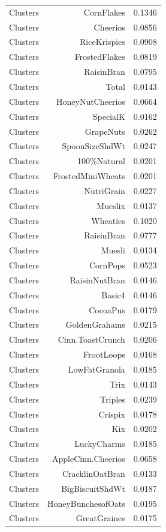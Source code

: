 \begin{longtable}{@{}lrr@{}}
Clusters & CornFlakes & 0.1346 \\
Clusters & Cheerios & 0.0856 \\
Clusters & RiceKrispies & 0.0908 \\
Clusters & FrostedFlakes & 0.0819 \\
Clusters & RaisinBran & 0.0795 \\
Clusters & Total & 0.0143 \\
Clusters & HoneyNutCheerios & 0.0664 \\
Clusters & SpecialK & 0.0162 \\
Clusters & GrapeNuts & 0.0262 \\
Clusters & SpoonSizeShdWt & 0.0247 \\
Clusters & 100\%Natural & 0.0201 \\
Clusters & FrostedMiniWheats & 0.0201 \\
Clusters & NutriGrain & 0.0227 \\
Clusters & Mueslix & 0.0137 \\
Clusters & Wheaties & 0.1020 \\
Clusters & RaisinBran & 0.0777 \\
Clusters & Muesli & 0.0134 \\
Clusters & CornPops & 0.0523 \\
Clusters & RaisinNutBran & 0.0146 \\
Clusters & Basic4 & 0.0146 \\
Clusters & CocoaPus & 0.0179 \\
Clusters & GoldenGrahams & 0.0215 \\
Clusters & Cinn.ToastCrunch & 0.0206 \\
Clusters & FrootLoops & 0.0168 \\
Clusters & LowFatGranola & 0.0185 \\
Clusters & Trix & 0.0143 \\
Clusters & Triples & 0.0239 \\
Clusters & Crispix & 0.0178 \\
Clusters & Kix & 0.0202 \\
Clusters & LuckyCharms & 0.0185 \\
Clusters & AppleCinn.Cheerios & 0.0658 \\
Clusters & CracklinOatBran & 0.0133 \\
Clusters & BigBiscuitShdWt & 0.0187 \\
Clusters & HoneyBunchesofOats & 0.0195 \\
Clusters & GreatGraines & 0.0175 \\

\end{longtable}
